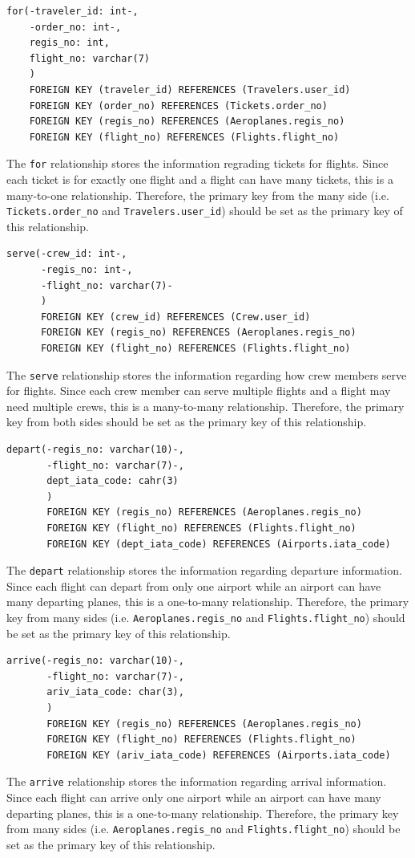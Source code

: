 \documentclass{article}
\begin{document}
	\begin{lstlisting}[keepspaces=true]
for(-traveler_id: int-, 
    -order_no: int-,
    regis_no: int, 
    flight_no: varchar(7)
    )
    FOREIGN KEY (traveler_id) REFERENCES (Travelers.user_id)
    FOREIGN KEY (order_no) REFERENCES (Tickets.order_no)
    FOREIGN KEY (regis_no) REFERENCES (Aeroplanes.regis_no)
    FOREIGN KEY (flight_no) REFERENCES (Flights.flight_no)
	\end{lstlisting}    
	The \texttt{for} relationship stores the information regrading tickets for flights. Since each ticket is for exactly one flight and a flight can have many tickets, this is a many-to-one relationship. Therefore, the primary key from the many side (i.e. \texttt{Tickets.order\_no} and \texttt{Travelers.user\_id}) should be set as the primary key of this relationship.

	\begin{lstlisting}[keepspaces=true]        
serve(-crew_id: int-, 
      -regis_no: int-, 
      -flight_no: varchar(7)-
      )
      FOREIGN KEY (crew_id) REFERENCES (Crew.user_id)
      FOREIGN KEY (regis_no) REFERENCES (Aeroplanes.regis_no)
      FOREIGN KEY (flight_no) REFERENCES (Flights.flight_no)
	\end{lstlisting}    
	The \texttt{serve} relationship stores the information regarding how crew members serve for flights. Since each crew member can serve multiple flights and a flight may need multiple crews, this is a many-to-many relationship. Therefore, the primary key from both sides should be set as the primary key of this relationship.

	\begin{lstlisting}[keepspaces=true] 
depart(-regis_no: varchar(10)-,
       -flight_no: varchar(7)-,
       dept_iata_code: cahr(3)
       )  
       FOREIGN KEY (regis_no) REFERENCES (Aeroplanes.regis_no)
       FOREIGN KEY (flight_no) REFERENCES (Flights.flight_no)
       FOREIGN KEY (dept_iata_code) REFERENCES (Airports.iata_code)
	\end{lstlisting}    
	The \texttt{depart} relationship stores the information regarding departure information. Since each flight can depart from only one airport while an airport can have many departing planes, this is a one-to-many relationship. Therefore, the primary key from many sides (i.e. \texttt{Aeroplanes.regis\_no} and \texttt{Flights.flight\_no}) should be set as the primary key of this relationship.

	\begin{lstlisting}[keepspaces=true]
arrive(-regis_no: varchar(10)-,
       -flight_no: varchar(7)-, 
       ariv_iata_code: char(3),
       )  
       FOREIGN KEY (regis_no) REFERENCES (Aeroplanes.regis_no)
       FOREIGN KEY (flight_no) REFERENCES (Flights.flight_no)
       FOREIGN KEY (ariv_iata_code) REFERENCES (Airports.iata_code)
	\end{lstlisting}    
	The \texttt{arrive} relationship stores the information regarding arrival information. Since each flight can arrive only one airport while an airport can have many departing planes, this is a one-to-many relationship. Therefore, the primary key from many sides (i.e. \texttt{Aeroplanes.regis\_no} and \texttt{Flights.flight\_no}) should be set as the primary key of this relationship.
\end{document}
